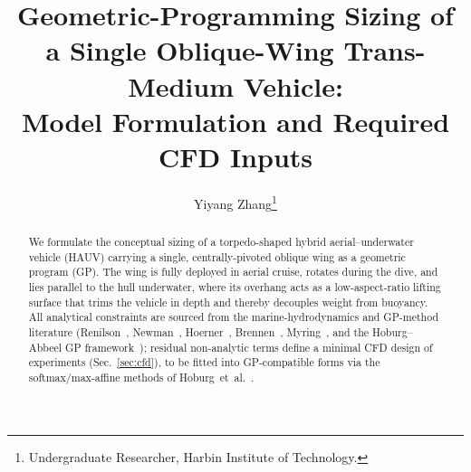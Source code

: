 \documentclass{new-aiaa}
\title{Geometric-Programming Sizing of a Single Oblique-Wing Trans-Medium Vehicle:\\ Model Formulation and Required CFD Inputs}
\author{Yiyang Zhang\footnote{Undergraduate Researcher, Harbin Institute of Technology.}}
\begin{document}
\maketitle

\begin{abstract}
We formulate the conceptual sizing of a torpedo-shaped hybrid aerial--underwater vehicle (HAUV)
carrying a single, centrally-pivoted oblique wing as a geometric program (GP). The wing is fully
deployed in aerial cruise, rotates during the dive, and lies parallel to the hull underwater, where
its overhang acts as a low-aspect-ratio lifting surface that trims the vehicle in depth and thereby
decouples weight from buoyancy. All analytical constraints are sourced from the marine-hydrodynamics
and GP-method literature (Renilson~\cite{renilson2018submarine}, Newman~\cite{newman2018marine},
Hoerner~\cite{hoerner1965fluid,hoerner1985fluid}, Brennen~\cite{brennen2014cavitation},
Myring~\cite{myring1976theoretical}, and the Hoburg--Abbeel GP framework~\cite{hoburg2014geometric,boyd2007tutorial});
residual non-analytic terms define a minimal CFD design of experiments (Sec.~\ref{sec:cfd}), to be
fitted into GP-compatible forms via the softmax/max-affine methods of Hoburg~et~al.~\cite{hoburg2016data}.
\end{abstract}
\end{document}
